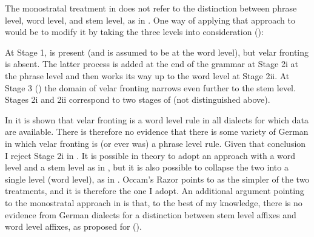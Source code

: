 The monostratal treatment in  does not refer to the distinction between phrase level, word level, and stem level, as in . One way of applying that approach to  would be to modify it by taking the three levels into consideration ():

\begin{table}%
\caption{\label{tab:fromex:43}Domain narrowing}
\end{table}


At Stage 1,  is present (and is assumed to be at the word level), but velar fronting is absent. The latter process is added at the end of the grammar at Stage 2i at the phrase level and then works its way up to the word level at Stage 2ii. At Stage 3 () the domain of velar fronting narrows even further to the stem level. Stages 2i and 2ii correspond to two stages of  (not distinguished above).

In  it is shown that velar fronting is a word level rule in all dialects for which data are available. There is therefore no evidence that there is some variety of German in which velar fronting is (or ever was) a phrase level rule. Given that conclusion I reject Stage 2i in . It is possible in theory to adopt an approach with a word level and a stem level as in , but it is also possible to collapse the two into a single level (word level), as in . Occam’s Razor points to  as the simpler of the two treatments, and it is therefore the one I adopt. An additional argument pointing to the monostratal approach in  is that, to the best of my knowledge, there is no evidence from German dialects for a distinction between stem level affixes and word level affixes, as proposed for  ().

